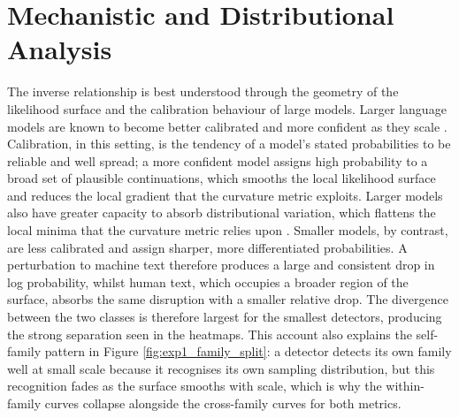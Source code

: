 \documentclass[logo,msc,cs]{infthesis}      %
\begin{document}
\section{Mechanistic and Distributional Analysis}
\label{sec:exp1_analysis}
The inverse relationship is best understood through the geometry of the likelihood surface and the calibration behaviour of large models. Larger language models are known to become better calibrated and more confident as they scale \citep{guo2017calibration, kadavath2022language}. Calibration, in this setting, is the tendency of a model's stated probabilities to be reliable and well spread; a more confident model assigns high probability to a broad set of plausible continuations, which smooths the local likelihood surface and reduces the local gradient that the curvature metric exploits. Larger models also have greater capacity to absorb distributional variation, which flattens the local minima that the curvature metric relies upon \citep{belkin2019reconciling}.
Smaller models, by contrast, are less calibrated and assign sharper, more differentiated probabilities. A perturbation to machine text therefore produces a large and consistent drop in log probability, whilst human text, which occupies a broader region of the surface, absorbs the same disruption with a smaller relative drop. The divergence between the two classes is therefore largest for the smallest detectors, producing the strong separation seen in the heatmaps. This account also explains the self-family pattern in Figure \ref{fig:exp1_family_split}: a detector detects its own family well at small scale because it recognises its own sampling distribution, but this recognition fades as the surface smooths with scale, which is why the within-family curves collapse alongside the cross-family curves for both metrics.
\end{document}

